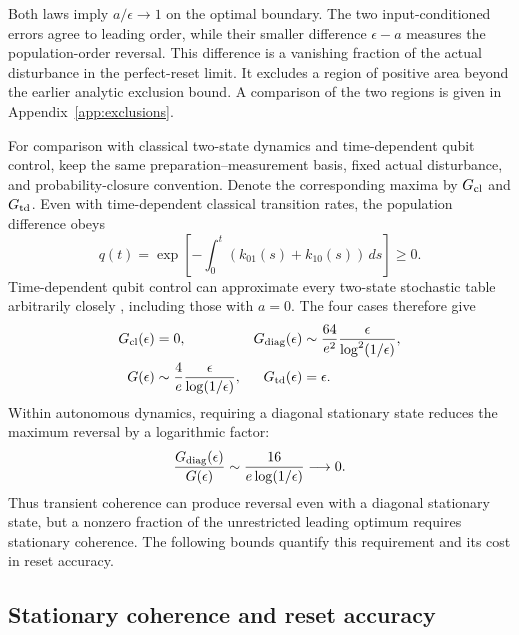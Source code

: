 \documentclass[aps,pra,reprint,amsmath,amssymb,nofootinbib,floatfix,longbibliography]{revtex4-2}
\theoremstyle{aps}
\newcommand{\eps}{\epsilon}
\begin{document}
Both laws imply $a/\eps\to1$ on the optimal boundary. The two input-conditioned errors agree to leading order, while their smaller difference $\eps-a$ measures the population-order reversal. This difference is a vanishing fraction of the actual disturbance in the perfect-reset limit. It excludes a region of positive area beyond the earlier analytic exclusion bound. A comparison of the two regions is given in Appendix~\ref{app:exclusions}.

For comparison with classical two-state dynamics and time-dependent qubit control, keep the same preparation--measurement basis, fixed actual disturbance, and probability-closure convention. Denote the corresponding maxima by $G_{\rm cl}$ and $G_{\rm td}$. Even with time-dependent classical transition rates, the population difference obeys
\[
q(t)=\exp\!\left[-\int_0^t(k_{01}(s)+k_{10}(s))\,ds\right]\ge0.
\]
Time-dependent qubit control can approximate every two-state stochastic table arbitrarily closely \cite{KorzekwaLostaglio2021}, including those with $a=0$. The four cases therefore give
\begin{equation}\label{eq:three}
 \begin{aligned}
 G_{\rm cl}(\eps)&=0,&
 G_{\rm diag}(\eps)&\sim\frac{64}{e^2}\frac{\eps}{\log^2(1/\eps)},\\
 G(\eps)&\sim\frac4e\frac{\eps}{\log(1/\eps)},&
 G_{\rm td}(\eps)&=\eps.
 \end{aligned}
\end{equation}
Within autonomous dynamics, requiring a diagonal stationary state reduces the maximum reversal by a logarithmic factor:
\begin{equation}\label{eq:ratio}
 \frac{G_{\rm diag}(\eps)}{G(\eps)}
 \sim\frac{16}{e\log(1/\eps)}\longrightarrow0.
\end{equation}
Thus transient coherence can produce reversal even with a diagonal stationary state, but a nonzero fraction of the unrestricted leading optimum requires stationary coherence. The following bounds quantify this requirement and its cost in reset accuracy.



\subsection{Stationary coherence and reset accuracy}
\end{document}
